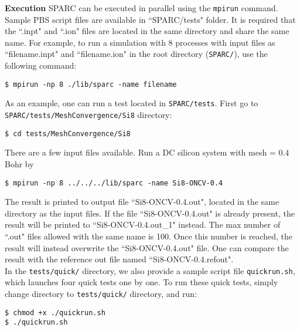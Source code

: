 \begin{frame}{\textbf{Execution}} \label{Execution}
SPARC can be executed in parallel using the \texttt{mpirun} command. Sample PBS script files are available in ``SPARC/tests" folder. It is required that the ``.inpt" and ``.ion" files are located in the same directory and share the same name. For example, to run a simulation with 8 processes with input files as ``filename.inpt" and ``filename.ion" in the root directory (\texttt{SPARC/}), use the following command:
\begin{verbatim}
$ mpirun -np 8 ./lib/sparc -name filename
\end{verbatim} 
As an example, one can run a test located in \texttt{SPARC/tests}. First go to \texttt{SPARC/tests/MeshConvergence/Si8} directory:
\begin{verbatim}
$ cd tests/MeshConvergence/Si8
\end{verbatim} 
There are a few input files available. Run a DC silicon system with mesh = $0.4$ Bohr by
\begin{verbatim}
$ mpirun -np 8 ../../../lib/sparc -name Si8-ONCV-0.4
\end{verbatim} 

The result is printed to output file ``Si8-ONCV-0.4.out", located in the same directory as the input files. If the file ``Si8-ONCV-0.4.out" is already present, the result will be printed to ``Si8-ONCV-0.4.out\_1" instead. The max number of ``.out" files allowed with the same name is 100. Once this number is reached, the result will instead overwrite the ``Si8-ONCV-0.4.out" file. One can compare the result with the reference out file named ``Si8-ONCV-0.4.refout".\\%

\hspace{3mm}In the \texttt{tests/quick/} directory, we also provide a sample script file \texttt{quickrun.sh}, which launches four quick tests one by one. To run these quick tests, simply change directory to \texttt{tests/quick/} directory, and run: 
\begin{verbatim}
$ chmod +x ./quickrun.sh
$ ./quickrun.sh
\end{verbatim} 

\end{frame}


